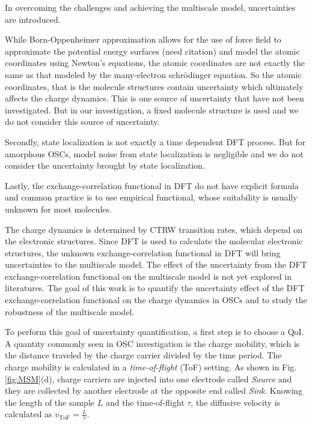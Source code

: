 \documentclass[letterpaper,12pt]{article}
\begin{document}
In overcoming the challenges and achieving the multiscale model, uncertainties are introduced. 

While Born-Oppenheimer approximation allows for the use of force field to approximate the potential energy surfaces (need citation) and model the atomic coordinates using Newton’s equations, the atomic coordinates are not exactly the same as that modeled by the many-electron schr\"{o}dinger equation.
So the atomic coordinates, that is the molecule structures contain uncertainty which ultimately affects the charge dynamics. 
This is one source of uncertainty that have not been investigated.
But in our investigation, a fixed molecule structure is used and we do not consider this source of uncertainty. 

Secondly, state localization is not exactly a time dependent DFT process. 
But for amorphous OSCs, model noise from state localization is negligible and we do not consider the uncertainty brought by state localization.

Lastly, the exchange-correlation functional in DFT do not have explicit formula and common practice is to use empirical functional, whose suitability is usually unknown for most molecules.

The charge dynamics is determined by CTRW transition rates, which depend on the electronic structures.
Since DFT is used to calculate the molecular electronic structures, the unknown exchange-correlation functional in DFT will bring uncertainties to the multiscale model. 
The effect of the uncertainty from the DFT exchange-correlation functional on the multiscale model is not yet explored in literatures. 
The goal of this work is to quantify the uncertainty effect of the DFT exchange-correlation functional on the charge dynamics in OSCs and to study the robustness of the multiscale model. 

To perform this goal of uncertainty quantification, a first step is to choose a QoI. A quantity commonly seen in OSC investigation is the charge mobility, which is the distance traveled by the charge carrier divided by the time period. 
The charge mobility is calculated in a \textit{time-of-flight} (ToF) setting. 
As shown in Fig.\ref{fig:MSM}(d), charge carriers are injected into one electrode called \textit{Source} and they are collected by another electrode at the opposite end called \textit{Sink}. 
Knowing the length of the sample $L$ and the time-of-flight $\tau$, the diffusive velocity is calculated as $v_\text{ToF}=\frac{L}{\tau}$.
\end{document}
